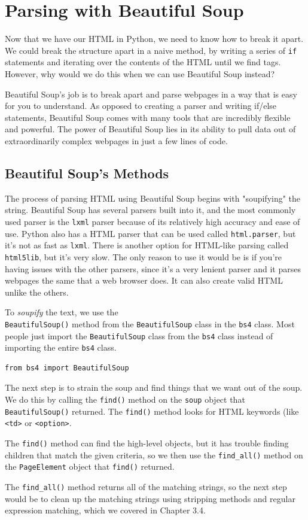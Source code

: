 \section{Parsing with Beautiful Soup}
Now that we have our HTML in Python, we need to know how to break it apart. We could break the structure apart in a naive method, by writing a series of \verb|if| statements and iterating over the contents of the HTML until we find tags. However, why would we do this when we can use Beautiful Soup instead?\par
Beautiful Soup's job is to break apart and parse webpages in a way that is easy for you to understand. As opposed to creating a parser and writing if/else statements, Beautiful Soup comes with many tools that are incredibly flexible and powerful. The power of Beautiful Soup lies in its ability to pull data out of extraordinarily complex webpages in just a few lines of code.\par
\subsection{Beautiful Soup's Methods}
The process of parsing HTML using Beautiful Soup begins with "soupifying" the string. Beautiful Soup has several parsers built into it, and the most commonly used parser is the \verb|lxml| parser because of its relatively high accuracy and ease of use. Python also has a HTML parser that can be used called \verb|html.parser|, but it's not as fast as \verb|lxml|. There is another option for HTML-like parsing called \verb|html5lib|, but it's very slow. The only reason to use it would be is if you're having issues with the other parsers, since it's a very lenient parser and it parses webpages the same that a web browser does. It can also create valid HTML unlike the others.\par
To \textit{soupify} the text, we use the \\\verb|BeautifulSoup()| method from the \verb|BeautifulSoup| class in the \verb|bs4| class. Most people just import the \verb|BeautifulSoup| class from the \verb|bs4| class instead of importing the entire \verb|bs4| class.\par
\begin{lstlisting}[style=pippython]
from bs4 import BeautifulSoup
\end{lstlisting}
The next step is to strain the soup and find things that we want out of the soup. We do this by calling the \verb|find()| method on the \verb|soup| object that \verb|BeautifulSoup()| returned. The \verb|find()| method looks for HTML keywords (like \verb|<td>| or \verb|<option>|.\par
The \verb|find()| method can find the high-level objects, but it has trouble finding children that match the given criteria, so we then use the \verb|find_all()| method on the \verb|PageElement| object that \verb|find()| returned.\par
The \verb|find_all()| method returns all of the matching strings, so the next step would be to clean up the matching strings using stripping methods and regular expression matching, which we covered in Chapter 3.4.
